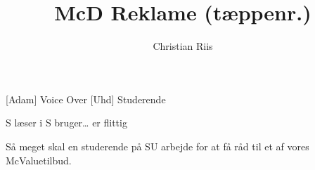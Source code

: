 \documentclass[a4paper]{article}
\title{McD Reklame (tæppenr.)}
\author{Christian Riis}
\begin{document}
\maketitle

\begin{roles}
  [Adam] Voice Over
  [Uhd] Studerende
\end{roles}

\begin{props}
   S læser i
   S bruger\ldots{} er flittig
\end{props}

\begin{sketch}
  

   Så meget skal en studerende på SU arbejde for at få råd
  til et af vores McValuetilbud.
  
\end{sketch}
\end{document}
